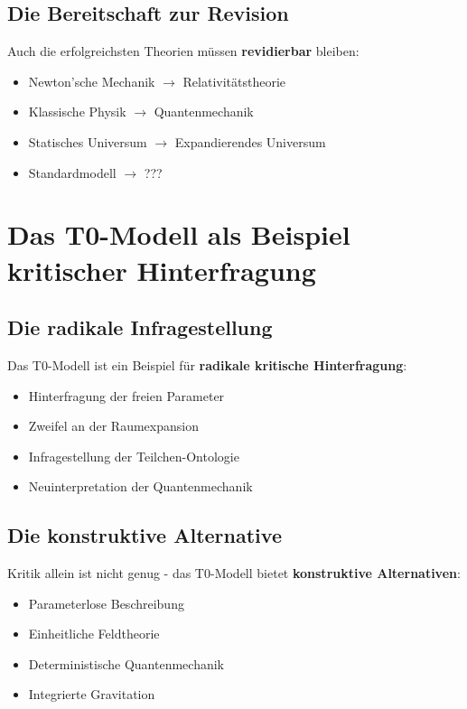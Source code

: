 \documentclass[12pt,a4paper]{report}
\begin{document}
	\subsection{Die Bereitschaft zur Revision}
	
	Auch die erfolgreichsten Theorien müssen \textbf{revidierbar} bleiben:
	
	\begin{itemize}
		\item Newton'sche Mechanik $\to$ Relativitätstheorie
		\item Klassische Physik $\to$ Quantenmechanik
		\item Statisches Universum $\to$ Expandierendes Universum
		\item Standardmodell $\to$ ???
	\end{itemize}
	
	\section{Das T0-Modell als Beispiel kritischer Hinterfragung}
	
	\subsection{Die radikale Infragestellung}
	
	Das T0-Modell ist ein Beispiel für \textbf{radikale kritische Hinterfragung}:
	
	\begin{itemize}
		\item Hinterfragung der freien Parameter
		\item Zweifel an der Raumexpansion
		\item Infragestellung der Teilchen-Ontologie
		\item Neuinterpretation der Quantenmechanik
	\end{itemize}
	
	\subsection{Die konstruktive Alternative}
	
	Kritik allein ist nicht genug - das T0-Modell bietet \textbf{konstruktive Alternativen}:
	
	\begin{itemize}
		\item Parameterlose Beschreibung
		\item Einheitliche Feldtheorie
		\item Deterministische Quantenmechanik
		\item Integrierte Gravitation
	\end{itemize}
	
\end{document}
